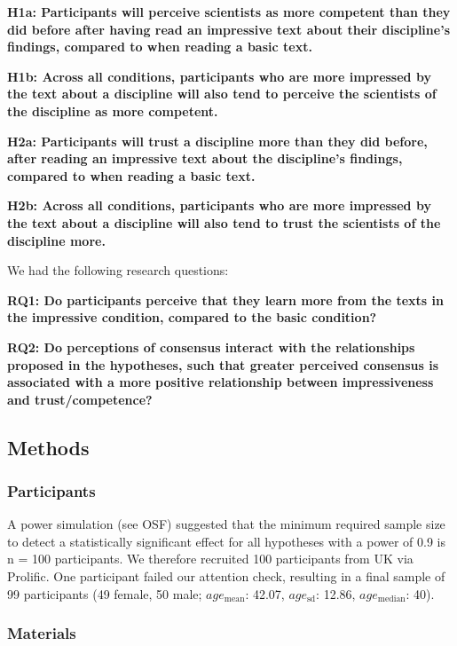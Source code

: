 \documentclass[
  doc,floatsintext]{apa6}
\begin{document}
\textbf{H1a: Participants will perceive scientists as more competent than they did before after having read an impressive text about their discipline's findings, compared to when reading a basic text.}

\textbf{H1b: Across all conditions, participants who are more impressed by the text about a discipline will also tend to perceive the scientists of the discipline as more competent.}

\textbf{H2a: Participants will trust a discipline more than they did before, after reading an impressive text about the discipline's findings, compared to when reading a basic text.}

\textbf{H2b: Across all conditions, participants who are more impressed by the text about a discipline will also tend to trust the scientists of the discipline more.}

We had the following research questions:

\textbf{RQ1: Do participants perceive that they learn more from the texts in the impressive condition, compared to the basic condition?}

\textbf{RQ2: Do perceptions of consensus interact with the relationships proposed in the hypotheses, such that greater perceived consensus is associated with a more positive relationship between impressiveness and trust/competence?}

\subsection{Methods}\label{methods}

\subsubsection{Participants}\label{participants}

A power simulation (see OSF) suggested that the minimum required sample size to detect a statistically significant effect for all hypotheses with a power of 0.9 is n = 100 participants. We therefore recruited 100 participants from UK via Prolific. One participant failed our attention check, resulting in a final sample of 99 participants (49 female, 50 male; \(age_\text{mean}\): 42.07, \(age_\text{sd}\): 12.86, \(age_\text{median}\): 40).

\subsubsection{Materials}\label{materials}
\end{document}
